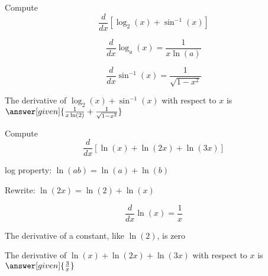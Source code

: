 \documentclass{ximera}
\begin{document}
\begin{problem} %
  Compute 
  \[
  \frac{d}{dx} \left[\log_2(x) + \sin^{-1}(x)\right]
  \]
  
    \begin{hint}
      \[
      \frac{d}{dx} \log_a(x) = \frac{1}{x\ln(a)}
      \]
    \end{hint}
		\begin{hint}
		  \[
      \frac{d}{dx} \sin^{-1}(x) = \frac{1}{\sqrt{1-x^2}}
      \]
		\end{hint}
		The derivative of $\log_2(x) + \sin^{-1}(x)$ with respect to $x$ is
		 $\answer[given]{\frac{1}{x\ln(2)}  + \frac{1}{\sqrt{1-x^2}}}$
	
\end{problem}


\begin{problem} %
  Compute 
  \[
  \frac{d}{dx} \left[\ln(x) + \ln(2x) + \ln(3x)\right]
  \]
    \begin{hint}
		  log property: $\ln(ab) = \ln(a) + \ln(b)$
		\end{hint}
    \begin{hint}
		  Rewrite: $\ln(2x) = \ln(2) + \ln(x)$
	  \end{hint}
	  \begin{hint}
      \[
      \frac{d}{dx} \ln(x) = \frac{1}{x}
      \]
    \end{hint}
		
		\begin{hint}
		  The derivative of a constant, like $\ln(2)$, is zero
		\end{hint}
		
		The derivative of $\ln(x) + \ln(2x) + \ln(3x)$ with respect to $x$ is
		 $\answer[given]{\frac{3}{x}}$
	
\end{problem}
\end{document}
